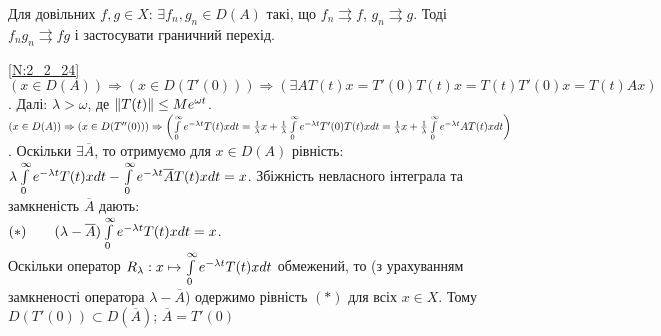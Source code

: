 Для довільних $f, g \in X$: $\exists f_n, g_n \in D(A)$ такі, що $f_n \rightrightarrows f$, 
$g_n \rightrightarrows g$. Тоді $f_n g_n \rightrightarrows fg$ і застосувати граничний перехід.

\noindent\ref{N:2_2_24} $(x\in D(A)) \Rightarrow \left( x\in D(T'(0))\right)
\Rightarrow (\exists AT(t)x = T'(0)T(t)x = T(t)T'(0)x = T(t)Ax)$.
Далі: $\lambda > \omega$, де $\left\lVert T(t)\right\rVert \leq M e^{\omega t}$.
$(x\in D(A)) \Rightarrow
\left( x\in D(T''(0))\right)\Rightarrow \left( \int\limits_{0}^{\infty} e^{-\lambda t}T(t)x dt =
\frac{1}{\lambda}x + \frac{1}{\lambda} \int\limits_{0}^{\infty} e^{-\lambda t}T'(0)T(t)x dt =
\frac{1}{\lambda}x + \frac{1}{\lambda} \int\limits_{0}^{\infty} e^{-\lambda t}AT(t)x dt
\right)$.
Оскільки $\exists \overline{A}$, то отримуємо для $x \in D(A)$ рівність:
$\lambda \int\limits_{0}^{\infty} e^{-\lambda t}T(t)x dt - \int\limits_{0}^{\infty} e^{-\lambda t}\overline{A}T(t)x dt = x$.
Збіжність невласного інтеграла та замкненість $\overline{A}$ дають:\\
$(*)\qquad (\lambda - \overline{A})\int\limits_{0}^{\infty} e^{-\lambda t}T(t)x dt = x$.\\
Оскільки оператор
$R_\lambda: x \mapsto \int\limits_{0}^{\infty} e^{-\lambda t}T(t)x dt$ обмежений,
то (з урахуванням замкненості оператора $\lambda - \overline{A}$) одержимо рівність $(*)$
для всіх $x \in X$. Тому $D(T'(0))\subset D(\overline{A})$; $\overline{A} = T'(0)$
